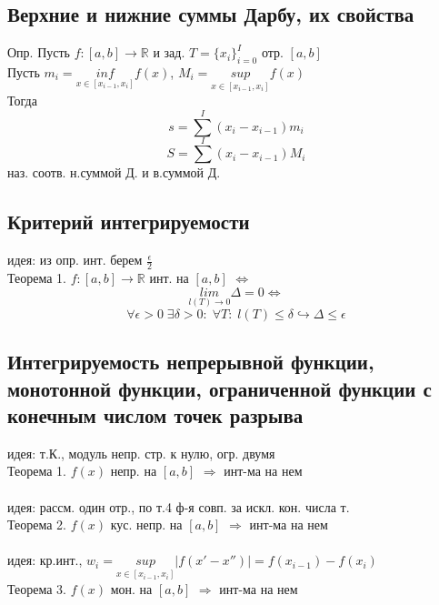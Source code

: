 \documentclass{article}
\begin{document}
\subsection{Верхние и нижние суммы Дарбу, их свойства}
Опр. Пусть $f:[a,b] \rightarrow \mathbb R$ и зад. $T = \{ x_i \}_{i=0}^I$ отр. $[a,b]$ \\
Пусть $ m_i = \underset{x \in [x_{i-1}, x_i]}{inf} f(x) $, $ M_i = \underset{x \in [x_{i-1}, x_i]}{sup} f(x) $ \\
Тогда
\begin{equation*}
    s = \sum^I (x_i - x_{i-1})m_i
\end{equation*}
\begin{equation*}
    S = \sum^I (x_i - x_{i-1})M_i
\end{equation*}
наз. соотв. н.суммой Д. и в.суммой Д.
\subsection{Критерий интегрируемости}
идея: из опр. инт. берем $\frac{\epsilon}{2}$ \\
Теорема 1. $f:[a,b]\rightarrow\mathbb R$ инт. на $[a,b]$ $\Leftrightarrow$
\begin{equation*}
    \underset{l(T) \rightarrow 0}{lim} \Delta = 0 \Leftrightarrow
\end{equation*}
\begin{equation*}
    \forall \epsilon > 0 \; \exists \delta > 0: \; \forall T: \; l(T) \leq \delta \hookrightarrow \Delta \leq \epsilon
\end{equation*}
\subsection{Интегрируемость непрерывной функции, монотонной функции, ограниченной функции с конечным числом точек разрыва}
идея: т.К., модуль непр. стр. к нулю, огр. двумя \\
Теорема 1. $f(x)$ непр. на $[a,b]$ $\Rightarrow$ инт-ма на нем \\
\\
идея: рассм. один отр., по т.4 ф-я совп. за искл. кон. числа т. \\
Теорема 2. $f(x)$ кус. непр. на $[a,b]$ $\Rightarrow$ инт-ма на нем \\
\\
идея: кр.инт., $w_i = \underset{x \in [x_{i-1}, x_i]}{sup} |f(x'-x'')| = f(x_{i-1}) - f(x_{i}) $ \\
Теорема 3. $f(x)$ мон. на $[a,b]$ $\Rightarrow$ инт-ма на нем \\
\end{document}
